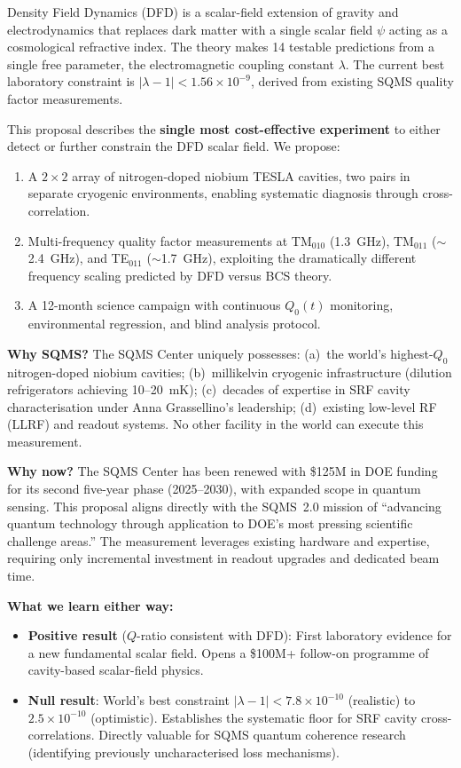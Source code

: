 \documentclass[11pt]{article}
\newcommand{\lbone}{|\lambda - 1|}
\newcommand{\ee}[1]{\times 10^{#1}}
\begin{document}
Density Field Dynamics (DFD) is a scalar-field extension of gravity and
electrodynamics that replaces dark matter with a single scalar field
$\psi$ acting as a cosmological refractive index. The theory makes 14
testable predictions from a single free parameter, the electromagnetic
coupling constant $\lambda$. The current best laboratory constraint is
$\lbone < 1.56\ee{-9}$, derived from existing SQMS quality factor
measurements.

This proposal describes the \textbf{single most cost-effective
experiment} to either detect or further constrain the DFD scalar field.
We propose:

\begin{enumerate}[nosep]
\item A $2\times 2$ array of nitrogen-doped niobium TESLA cavities, two
  pairs in separate cryogenic environments, enabling systematic diagnosis
  through cross-correlation.
\item Multi-frequency quality factor measurements at TM$_{010}$
  (1.3~GHz), TM$_{011}$ ($\sim$2.4~GHz), and TE$_{011}$
  ($\sim$1.7~GHz), exploiting the dramatically different
  frequency scaling predicted by DFD versus BCS theory.
\item A 12-month science campaign with continuous $Q_0(t)$ monitoring,
  environmental regression, and blind analysis protocol.
\end{enumerate}

\textbf{Why SQMS?} The SQMS Center uniquely possesses: (a)~the world's
highest-$Q_0$ nitrogen-doped niobium cavities; (b)~millikelvin cryogenic
infrastructure (dilution refrigerators achieving 10--20~mK);
(c)~decades of expertise in SRF cavity characterisation under Anna
Grassellino's leadership; (d)~existing low-level RF (LLRF) and readout
systems. No other facility in the world can execute this measurement.

\textbf{Why now?} The SQMS Center has been renewed with \$125M in DOE
funding for its second five-year phase (2025--2030), with expanded scope
in quantum sensing. This proposal aligns directly with the SQMS~2.0
mission of ``advancing quantum technology through application to DOE's
most pressing scientific challenge areas.'' The measurement leverages
existing hardware and expertise, requiring only incremental investment in
readout upgrades and dedicated beam time.

\textbf{What we learn either way:}
\begin{itemize}[nosep]
\item \textbf{Positive result} ($Q$-ratio consistent with DFD): First
  laboratory evidence for a new fundamental scalar field. Opens a
  \$100M+ follow-on programme of cavity-based scalar-field physics.
\item \textbf{Null result}: World's best constraint $\lbone <
  7.8\ee{-10}$ (realistic) to $2.5\ee{-10}$ (optimistic).
  Establishes the systematic floor for SRF cavity cross-correlations.
  Directly valuable for SQMS quantum coherence research (identifying
  previously uncharacterised loss mechanisms).
\end{itemize}
\end{document}
